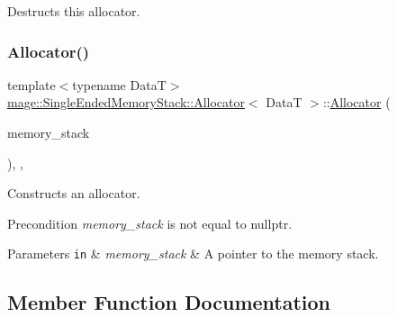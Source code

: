Destructs this allocator. \hypertarget{structmage_1_1_single_ended_memory_stack_1_1_allocator_a991173b1fccf74994dc9298b3cffb795}{}\label{structmage_1_1_single_ended_memory_stack_1_1_allocator_a991173b1fccf74994dc9298b3cffb795} 
\subsubsection{\texorpdfstring{Allocator()}{Allocator()}\hspace{0.1cm}{\footnotesize\ttfamily [4/4]}}
{\footnotesize\ttfamily template$<$typename DataT$>$ \\
\hyperlink{structmage_1_1_single_ended_memory_stack_1_1_allocator}{mage\+::\+Single\+Ended\+Memory\+Stack\+::\+Allocator}$<$ DataT $>$\+::\hyperlink{structmage_1_1_single_ended_memory_stack_1_1_allocator}{Allocator} (\begin{DoxyParamCaption}\item[{\hyperlink{classmage_1_1_single_ended_memory_stack}{Single\+Ended\+Memory\+Stack} $\ast$}]{memory\+\_\+stack }\end{DoxyParamCaption})\hspace{0.3cm}{\ttfamily [explicit]}, {\ttfamily [private]}, {\ttfamily [noexcept]}}

Constructs an allocator.

\begin{DoxyPrecond}{Precondition}
{\itshape memory\+\_\+stack} is not equal to {\ttfamily nullptr}. 
\end{DoxyPrecond}

\begin{DoxyParams}[1]{Parameters}
\mbox{\tt in}  & {\em memory\+\_\+stack} & A pointer to the memory stack. \\
\hline
\end{DoxyParams}


\subsection{Member Function Documentation}
\hypertarget{structmage_1_1_single_ended_memory_stack_1_1_allocator_a5bb7b9d5ba3907afb70306f7606ab6cd}{}\label{structmage_1_1_single_ended_memory_stack_1_1_allocator_a5bb7b9d5ba3907afb70306f7606ab6cd} 
